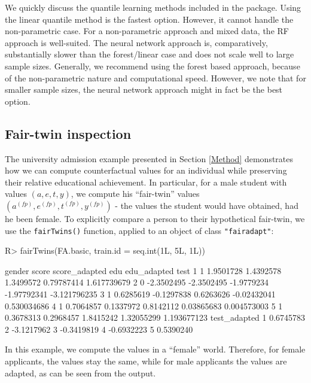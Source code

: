 \documentclass[
  notitle]{jss}
\begin{document}
We quickly discuss the quantile learning methods included in the
package. Using the linear quantile method is the fastest option.
However, it cannot handle the non-parametric case. For a non-parametric
approach and mixed data, the RF approach is well-suited. The neural
network approach is, comparatively, substantially slower than the
forest/linear case and does not scale well to large sample sizes.
Generally, we recommend using the forest based approach, because of the
non-parametric nature and computational speed. However, we note that for
smaller sample sizes, the neural network approach might in fact be the
best option.

\hypertarget{fair-twin-inspection}{%
\subsection{Fair-twin inspection}\label{fair-twin-inspection}}

The university admission example presented in Section \ref{Method}
demonstrates how we can compute counterfactual values for an individual
while preserving their relative educational achievement. In particular,
for a male student with values \((a, e, t, y)\), we compute his
``fair-twin'' values
\(( {a}^{(fp)},  {e}^{(fp)},  {t}^{(fp)},  {y}^{(fp)})\) - the values
the student would have obtained, had he been female. To explicitly
compare a person to their hypothetical fair-twin, we use the
\texttt{fairTwins()} function, applied to an object of class
\texttt{"fairadapt"}:

\begin{CodeChunk}
\begin{CodeInput}
R> fairTwins(FA.basic, train.id = seq.int(1L, 5L, 1L))
\end{CodeInput}
\begin{CodeOutput}
  gender      score score_adapted        edu edu_adapted         test
1      1  1.9501728     1.4392578  1.3499572  0.79787414  1.617739679
2      0 -2.3502495    -2.3502495 -1.9779234 -1.97792341 -3.121796235
3      1  0.6285619    -0.1297838  0.6263626 -0.02432041  0.530034686
4      1  0.7064857     0.1337972  0.8142112  0.03865683  0.004573003
5      1  0.3678313     0.2968457  1.8415242  1.32055299  1.193677123
  test_adapted
1    0.6745783
2   -3.1217962
3   -0.3419819
4   -0.6932223
5    0.5390240
\end{CodeOutput}
\end{CodeChunk}

In this example, we compute the values in a ``female'' world. Therefore,
for female applicants, the values stay the same, while for male
applicants the values are adapted, as can be seen from the output.
\end{document}
